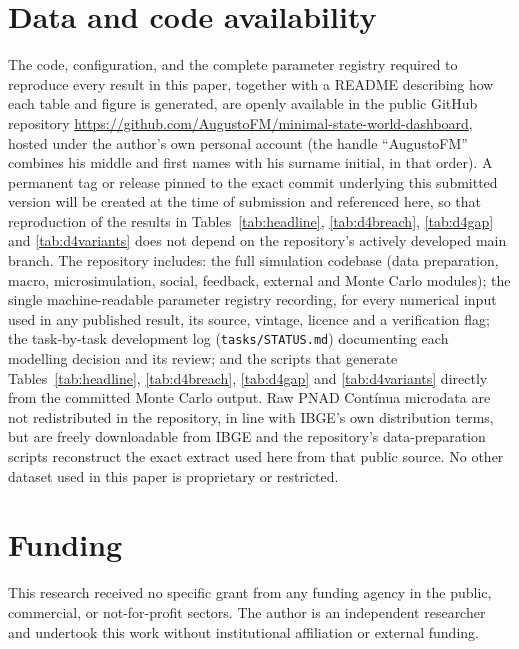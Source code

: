 \documentclass[11pt,a4paper]{article}
\begin{document}
\section*{Data and code availability}
The code, configuration, and the complete parameter registry required to reproduce every result in this paper, together with a README describing how each table and figure is generated, are openly available in the public GitHub repository \url{https://github.com/AugustoFM/minimal-state-world-dashboard}, hosted under the author's own personal account (the handle ``AugustoFM'' combines his middle and first names with his surname initial, in that order). A permanent tag or release pinned to the exact commit underlying this submitted version will be created at the time of submission and referenced here, so that reproduction of the results in Tables~\ref{tab:headline}, \ref{tab:d4breach}, \ref{tab:d4gap} and \ref{tab:d4variants} does not depend on the repository's actively developed main branch. The repository includes: the full simulation codebase (data preparation, macro, microsimulation, social, feedback, external and Monte Carlo modules); the single machine-readable parameter registry recording, for every numerical input used in any published result, its source, vintage, licence and a verification flag; the task-by-task development log (\texttt{tasks/STATUS.md}) documenting each modelling decision and its review; and the scripts that generate Tables~\ref{tab:headline}, \ref{tab:d4breach}, \ref{tab:d4gap} and \ref{tab:d4variants} directly from the committed Monte Carlo output. Raw PNAD Cont\'inua microdata are not redistributed in the repository, in line with IBGE's own distribution terms, but are freely downloadable from IBGE and the repository's data-preparation scripts reconstruct the exact extract used here from that public source. No other dataset used in this paper is proprietary or restricted.

\section*{Funding}
This research received no specific grant from any funding agency in the public, commercial, or not-for-profit sectors. The author is an independent researcher and undertook this work without institutional affiliation or external funding.
\end{document}
